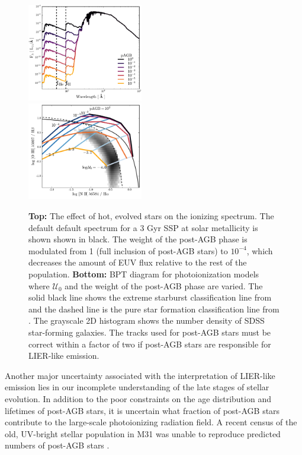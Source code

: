 \documentclass[twocolumn, tighten]{aastex61}
\newcommand{\U}{\ensuremath{\mathcal{U}_{0}}}
\begin{document}
\begin{figure}
  \begin{centering}
    \includegraphics[width=0.45\textwidth]{f26a.pdf}\\
    \includegraphics[width=0.45\textwidth]{f26b.pdf}
    \caption{\textbf{Top:} The effect of hot, evolved stars on the ionizing spectrum. The default default spectrum for a 3 Gyr SSP at solar metallicity is shown shown in black. The weight of the post-AGB phase is modulated from 1 (full inclusion of post-AGB stars) to $10^{-4}$, which decreases the amount of EUV flux relative to the rest of the population. \textbf{Bottom:} BPT diagram for photoionization models where \U{} and the weight of the post-AGB phase are varied. The solid black line shows the extreme starburst classification line from \citet{Kewley01} and the dashed line is the pure star formation classification line from \citet{Kauffmann03a}. The grayscale 2D histogram shows the number density of SDSS star-forming galaxies. The \citet{Vassiliadis} tracks used for post-AGB stars must be correct within a factor of two if post-AGB stars are responsible for LIER-like emission.}
    \label{fig:hotstars}
  \end{centering}
\end{figure}

Another major uncertainty associated with the interpretation of LIER-like emission lies in our incomplete understanding of the late stages of stellar evolution. In addition to the poor constraints on the age distribution and lifetimes of post-AGB stars, it is uncertain what fraction of post-AGB stars contribute to the large-scale photoionizing radiation field. A recent census of the old, UV-bright stellar population in M31 was unable to reproduce predicted numbers of post-AGB stars \citep{Rosenfield12}. 
\end{document}
